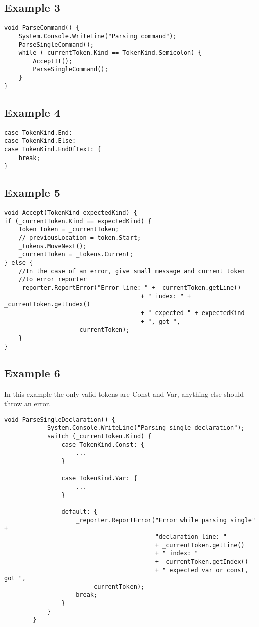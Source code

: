 \documentclass{article}
\begin{document}
\subsection{Example 3}
\begin{lstlisting}
void ParseCommand() {
	System.Console.WriteLine("Parsing command");
	ParseSingleCommand();
	while (_currentToken.Kind == TokenKind.Semicolon) {
		AcceptIt();
		ParseSingleCommand();
	}
}
\end{lstlisting}

\subsection{Example 4}
\begin{lstlisting}
case TokenKind.End:
case TokenKind.Else:
case TokenKind.EndOfText: {
	break;
}
\end{lstlisting}

\subsection{Example 5}
\begin{lstlisting}
void Accept(TokenKind expectedKind) {
if (_currentToken.Kind == expectedKind) {
	Token token = _currentToken;
	//_previousLocation = token.Start;
	_tokens.MoveNext();
	_currentToken = _tokens.Current;
} else {
	//In the case of an error, give small message and current token
	//to error reporter
    _reporter.ReportError("Error line: " + _currentToken.getLine()
                                      + " index: " + _currentToken.getIndex()
                                      + " expected " + expectedKind
                                      + ", got ",              
                    _currentToken);
	}
}
\end{lstlisting}

\subsection{Example 6}
In this example the only valid tokens are Const and Var, anything else should throw an error.

\begin{lstlisting}
void ParseSingleDeclaration() {
            System.Console.WriteLine("Parsing single declaration");
            switch (_currentToken.Kind) {
                case TokenKind.Const: {
                	...
                }

                case TokenKind.Var: {
                	...
                }

                default: {
                    _reporter.ReportError("Error while parsing single" +
                                          "declaration line: "
                                          + _currentToken.getLine()
                                          + " index: "
                                          + _currentToken.getIndex()
                                          + " expected var or const, got ",
                        _currentToken);
                    break;
                }
            }
		}
\end{lstlisting}
\end{document}

